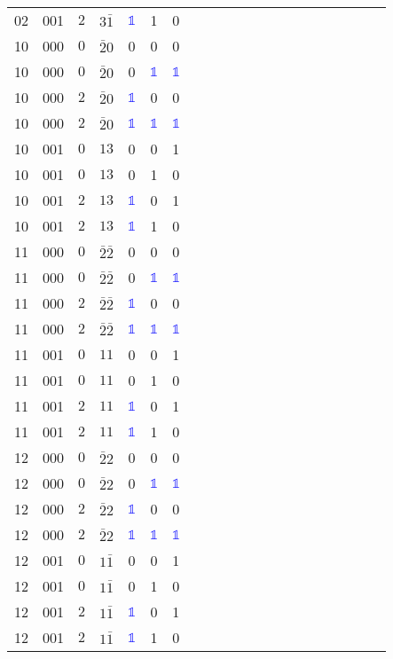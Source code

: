 \begin{longtable*}{c| cccccccccccccccccccc }
02& 001& $2$& $3\bar{1}$& \textcolor{blue}{$\mathds{1}$}& 1& 0\\
10& 000& $0$& $\bar{2}0$& 0& 0& 0\\
10& 000& $0$& $\bar{2}0$& 0& \textcolor{blue}{$\mathds{1}$}& \textcolor{blue}{$\mathds{1}$}\\
10& 000& $2$& $\bar{2}0$& \textcolor{blue}{$\mathds{1}$}& 0& 0\\
10& 000& $2$& $\bar{2}0$& \textcolor{blue}{$\mathds{1}$}& \textcolor{blue}{$\mathds{1}$}& \textcolor{blue}{$\mathds{1}$}\\
10& 001& $0$& $13$& 0& 0& 1\\
10& 001& $0$& $13$& 0& 1& 0\\
10& 001& $2$& $13$& \textcolor{blue}{$\mathds{1}$}& 0& 1\\
10& 001& $2$& $13$& \textcolor{blue}{$\mathds{1}$}& 1& 0\\
11& 000& $0$& $\bar{2}\bar{2}$& 0& 0& 0\\
11& 000& $0$& $\bar{2}\bar{2}$& 0& \textcolor{blue}{$\mathds{1}$}& \textcolor{blue}{$\mathds{1}$}\\
11& 000& $2$& $\bar{2}\bar{2}$& \textcolor{blue}{$\mathds{1}$}& 0& 0\\
11& 000& $2$& $\bar{2}\bar{2}$& \textcolor{blue}{$\mathds{1}$}& \textcolor{blue}{$\mathds{1}$}& \textcolor{blue}{$\mathds{1}$}\\
11& 001& $0$& $11$& 0& 0& 1\\
11& 001& $0$& $11$& 0& 1& 0\\
11& 001& $2$& $11$& \textcolor{blue}{$\mathds{1}$}& 0& 1\\
11& 001& $2$& $11$& \textcolor{blue}{$\mathds{1}$}& 1& 0\\
12& 000& $0$& $\bar{2}2$& 0& 0& 0\\
12& 000& $0$& $\bar{2}2$& 0& \textcolor{blue}{$\mathds{1}$}& \textcolor{blue}{$\mathds{1}$}\\
12& 000& $2$& $\bar{2}2$& \textcolor{blue}{$\mathds{1}$}& 0& 0\\
12& 000& $2$& $\bar{2}2$& \textcolor{blue}{$\mathds{1}$}& \textcolor{blue}{$\mathds{1}$}& \textcolor{blue}{$\mathds{1}$}\\
12& 001& $0$& $1\bar{1}$& 0& 0& 1\\
12& 001& $0$& $1\bar{1}$& 0& 1& 0\\
12& 001& $2$& $1\bar{1}$& \textcolor{blue}{$\mathds{1}$}& 0& 1\\
12& 001& $2$& $1\bar{1}$& \textcolor{blue}{$\mathds{1}$}& 1& 0\\

\end{longtable*}

